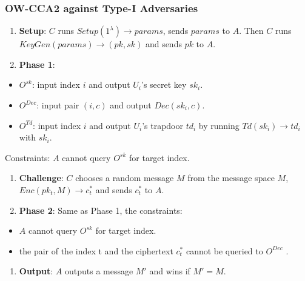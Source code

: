 \documentclass[
]{article}
\providecommand{\tightlist}{%
  \setlength{\itemsep}{0pt}\setlength{\parskip}{0pt}}
\begin{document}
\hypertarget{ow-cca2-against-type-i-adversaries}{%
\subsubsection{OW-CCA2 against Type-I
Adversaries}\label{ow-cca2-against-type-i-adversaries}}

\begin{enumerate}
\def\labelenumi{\arabic{enumi}.}
\item
  \textbf{Setup}: \(C\) runs \(Setup(1^\lambda)\rightarrow params\),
  sends \(params\) to \(A\). Then \(C\) runs
  \(KeyGen(params) \rightarrow (pk, sk)\) and sends \(pk\) to \(A\).
\item
  \textbf{Phase 1}:
\end{enumerate}

\begin{itemize}
\tightlist
\item
  \(O^{sk}\): input index \(i\) and output \(U_i\)'s secret key
  \(sk_i\).
\item
  \(O^{Dec}\): input pair \((i, c)\) and output \(Dec(sk_i, c)\).
\item
  \(O^{Td}\): input index \(i\) and output \(U_i\)'s trapdoor \(td_i\)
  by running \(Td(sk_i)\rightarrow td_i\) with \(sk_i\).
\end{itemize}

Constraints: \(A\) cannot query \(O^{sk}\) for target index.

\begin{enumerate}
\def\labelenumi{\arabic{enumi}.}
\setcounter{enumi}{2}
\item
  \textbf{Challenge}: \(C\) chooses a random message \(M\) from the
  message space \(M\), \(Enc(pk_{t}, M) \rightarrow c_{t}^*\) and sends
  \(c_{t}^*\) to \(A\).
\item
  \textbf{Phase 2}: Same as Phase 1, the constraints:
\end{enumerate}

\begin{itemize}
\tightlist
\item
  \(A\) cannot query \(O^{sk}\) for target index.
\item
  the pair of the index t and the ciphertext \(c_{t}^*\) cannot be
  queried to \(O^{Dec}\) .
\end{itemize}

\begin{enumerate}
\def\labelenumi{\arabic{enumi}.}
\setcounter{enumi}{4}
\tightlist
\item
  \textbf{Output}: \(A\) outputs a message \(M'\) and wins if
  \(M' = M\).
\end{enumerate}
\end{document}
